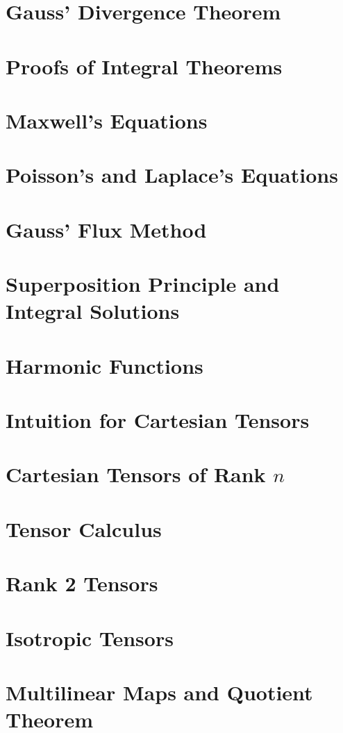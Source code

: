 \documentclass{article}
\begin{document}
\section{Gauss' Divergence Theorem}

\section{Proofs of Integral Theorems}

\section{Maxwell's Equations}

\section{Poisson's and Laplace's Equations}

\section{Gauss' Flux Method}

\section{Superposition Principle and Integral Solutions}

\section{Harmonic Functions}

\section{Intuition for Cartesian Tensors}

\section{Cartesian Tensors of Rank $n$}

\section{Tensor Calculus}

\section{Rank 2 Tensors}

\section{Isotropic Tensors}

\section{Multilinear Maps and Quotient Theorem}

\end{document}

